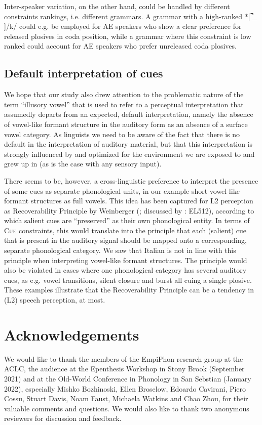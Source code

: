 \documentclass[output=paper,colorlinks,citecolor=brown]{langscibook}
\begin{document}
Inter-speaker variation, on the other hand, could be handled by different constraints rankings, i.e. different grammars. A grammar with a high-ranked *[ ̚\_ ]/k/ could e.g. be employed for AE speakers who show a clear preference for released plosives in coda position, while a grammar where this constraint is low ranked could account for AE speakers who prefer unreleased coda plosives. 
 

\subsection{Default interpretation of cues}

We hope that our study also drew attention to the problematic nature of the term “illusory vowel” that is used to refer to a perceptual interpretation that assumedly departs from an expected, default interpretation, namely the absence of vowel-like formant structure in the auditory form as an absence of a surface vowel category. As linguists we need to be aware of the fact that there is no default in the interpretation of auditory material, but that this interpretation is strongly influenced by and optimized for the environment we are exposed to and grew up in (as is the case with any sensory input).

There seems to be, however, a cross-linguistic preference to interpret the presence of some cues as separate phonological units, in our example short vowel-like formant structures as full vowels. This idea has been captured for L2 perception as Recoverability Principle by Weinberger (\citeyear{Weinberger1994}; discussed by \cite{JaggersBaese-Berk2020}: EL512), according to which salient cues are “preserved” as their own phonological entity. In terms of C\textsc{ue} constraints, this would translate into the principle that each (salient) cue that is present in the auditory signal should be mapped onto a corresponding, separate  phonological category. We saw that Italian is not in line with this principle when interpreting vowel-like formant structures. The principle would also be violated in cases where one phonological category has several auditory cues, as e.g. vowel transitions, silent closure and burst all cuing a single plosive. These examples illustrate that the Recoverability Principle can be a tendency in (L2) speech perception, at most.


\section*{Acknowledgements}
We would like to thank the members of the EmpiPhon research group at the ACLC, the audience at the Epenthesis Workshop in Stony Brook (September 2021) and at the Old-World Conference in Phonology in San Sebstian (January 2022), especially Mishko Bozhinoski, Ellen Broselow, Edoardo Cavirani, Piero Cossu, Stuart Davis, Noam Faust, Michaela Watkins and Chao Zhou, for their valuable comments and questions. We would also like to thank two anonymous reviewers for discussion and feedback.


{\printbibliography[heading=subbibliography,notkeyword=this]}
\end{document}
